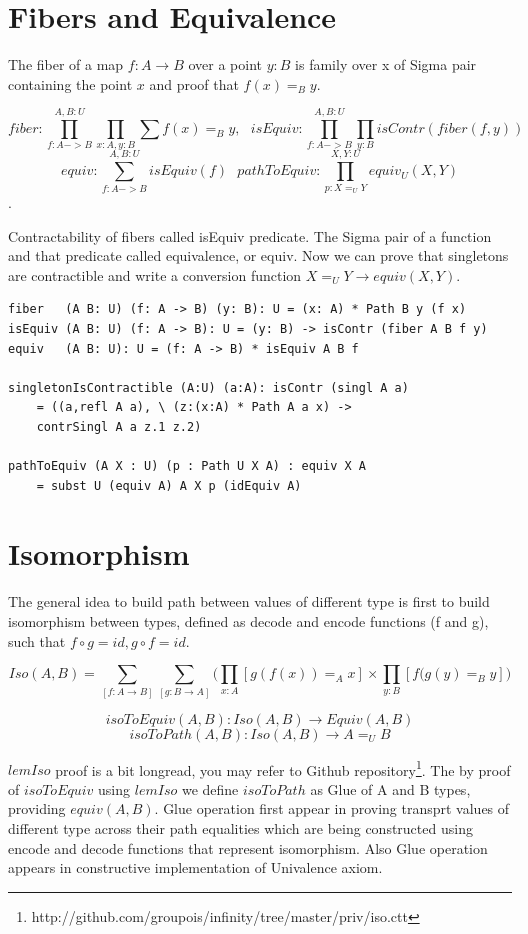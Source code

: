 \documentclass{svproc}
\begin{document}
\section{Fibers and Equivalence}

The fiber of a map $f : A \rightarrow B$ over a point $y : B$ is family over x
of Sigma pair containing the point $x$ and proof that $f(x)=_B y$.

$$fiber : \prod_{f:A->B}^{A,B:U}\prod_{x:A,y:B}\sum f(x) =_B y,\ \ \ 
  isEquiv : \prod_{f:A->B}^{A,B:U}\prod_{y:B} isContr(fiber(f,y))$$
$$equiv : \sum_{f:A->B}^{A,B:U} isEquiv(f) \ \ \ 
  pathToEquiv: \prod_{p: X =_U Y}^{X,Y:U} equiv_U(X,Y)$$.

Contractability of fibers called isEquiv predicate. The Sigma pair of
a function and that predicate called equivalence, or equiv. Now we
can prove that singletons are contractible and write a conversion
function $X=_U Y \rightarrow equiv(X,Y)$.

\begin{lstlisting}[mathescape=true]
fiber   (A B: U) (f: A -> B) (y: B): U = (x: A) * Path B y (f x)
isEquiv (A B: U) (f: A -> B): U = (y: B) -> isContr (fiber A B f y)
equiv   (A B: U): U = (f: A -> B) * isEquiv A B f

singletonIsContractible (A:U) (a:A): isContr (singl A a)
    = ((a,refl A a), \ (z:(x:A) * Path A a x) ->
    contrSingl A a z.1 z.2)

pathToEquiv (A X : U) (p : Path U X A) : equiv X A
    = subst U (equiv A) A X p (idEquiv A)
\end{lstlisting}

\section{Isomorphism}

The general idea to build path between values of different type is first
to build isomorphism between types, defined as decode and encode functions (f and g),
such that $f \circ g = id, g \circ f = id$.

$$Iso(A,B) = \sum_{[f:A\rightarrow B]}\sum_{[g:B\rightarrow A]}\Biggl( \prod_{x:A} [ g(f(x)) =_A x ] \times \prod_{y:B} [ f(g(y) =_B y ] \Biggr)$$

$$isoToEquiv(A,B) : Iso(A,B) \rightarrow Equiv(A,B)$$
$$isoToPath(A,B) : Iso(A,B) \rightarrow A =_U B$$

$lemIso$ proof is a bit longread, you may refer to Github
repository\footnote{http://github.com/groupois/infinity/tree/master/priv/iso.ctt}.
The by proof of $isoToEquiv$ using $lemIso$ we define $isoToPath$ as
Glue of A and B types, providing $equiv(A,B)$. Glue operation first appear in
proving transprt values of different type across their path equalities which are being constructed
using encode and decode functions that represent isomorphism. Also Glue operation
appears in constructive implementation of Univalence axiom\cite{Mortberg17}.
\end{document}
